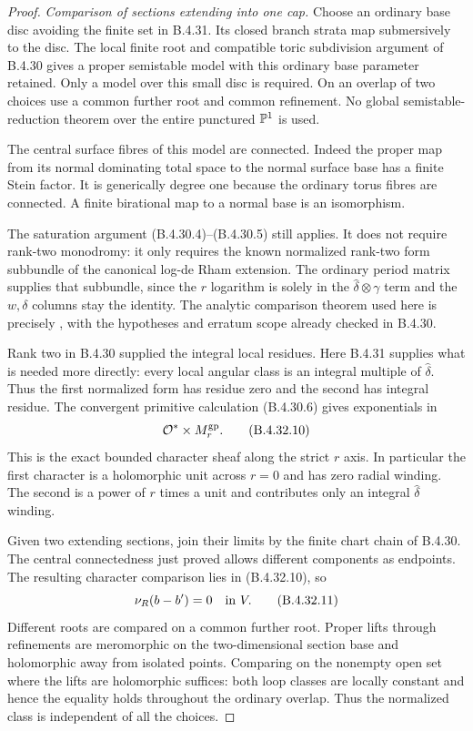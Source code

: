 \begin{proof}
\emph{Comparison of sections extending into one cap.}
Choose an ordinary base disc avoiding the finite set in
B.4.31. Its closed branch strata map submersively to the
disc. The local finite root and compatible toric subdivision
argument of B.4.30 gives a proper semistable model with this
ordinary base parameter retained. Only a model over this
small disc is required. On an overlap of two choices use a
common further root and common refinement. No global
semistable-reduction theorem over the entire punctured
$\mathbb P^1$ is used.

The central surface fibres of this model are connected.
Indeed the proper map from its normal dominating total space
to the normal surface base has a finite Stein factor.
It is generically degree one because the ordinary torus
fibres are connected. A finite birational map to a normal
base is an isomorphism.

The saturation argument (B.4.30.4)--(B.4.30.5) still applies.
It does not require rank-two monodromy: it only requires the
known normalized rank-two form subbundle of the canonical
log-de Rham extension. The ordinary period matrix supplies
that subbundle, since the $r$ logarithm is solely in the
$\widehat\delta\otimes\gamma$ term and the $w,\delta$
columns stay the identity. The analytic comparison theorem
used here is precisely
\citet[Theorem 6.3]{IKN2005E}, with the hypotheses and erratum
scope already checked in B.4.30.

Rank two in B.4.30 supplied the integral local residues.
Here B.4.31 supplies what is needed more directly: every
local angular class is an integral multiple of
$\widehat\delta$. Thus the first normalized form has residue
zero and the second has integral residue. The convergent
primitive calculation (B.4.30.6) gives exponentials in
\[
              \mathcal O^*\times M_r^{\rm gp}.
 \tag{B.4.32.10}
\]
This is the exact bounded character sheaf along the strict
$r$ axis. In particular the first character is a holomorphic
unit across $r=0$ and has zero radial winding. The second
is a power of $r$ times a unit and contributes only an
integral $\widehat\delta$ winding.

Given two extending sections, join their limits by the finite
chart chain of B.4.30. The central connectedness just proved
allows different components as endpoints. The resulting
character comparison lies in (B.4.32.10), so
\[
               \nu_R(b-b')=0\quad\hbox{in }V.
 \tag{B.4.32.11}
\]
Different roots are compared on a common further root.
Proper lifts through refinements are meromorphic on the
two-dimensional section base and holomorphic away from
isolated points. Comparing on the nonempty open set where
the lifts are holomorphic suffices: both loop classes are
locally constant and hence the equality holds throughout
the ordinary overlap. Thus the normalized class is
independent of all the choices.


\end{proof}
